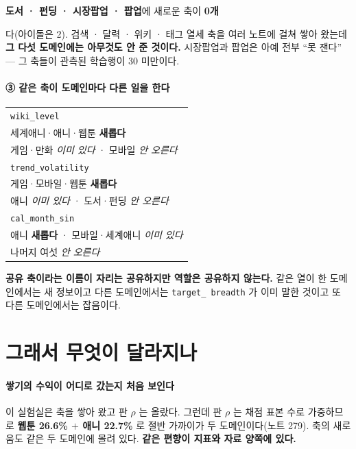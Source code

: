 \documentclass[10pt]{article}
\begin{document}
\begin{center}\small
\textbf{도서 · 펀딩 · 시장팝업 · 팝업}에 새로운 축이 \textbf{0개}
\end{center}

다(아이돌은 2). 검색 · 달력 · 위키 · 태그 열세 축을 여러 노트에 걸쳐 쌓아
왔는데 \textbf{그 다섯 도메인에는 아무것도 안 준 것이다.} 시장팝업과 팝업은
아예 전부 ``못 잰다'' --- 그 축들이 관측된 학습행이 30 미만이다.

\paragraph{③ 같은 축이 도메인마다 다른 일을 한다}

\begin{center}\footnotesize
\begin{tabular}{l}
\hline
\texttt{wiki\_level} \\
\quad 세계애니·애니·웹툰 \textbf{새롭다} \\
\quad 게임·만화 \emph{이미 있다} · 모바일 \emph{안 오른다} \\
\hline
\texttt{trend\_volatility} \\
\quad 게임·모바일·웹툰 \textbf{새롭다} \\
\quad 애니 \emph{이미 있다} · 도서·펀딩 \emph{안 오른다} \\
\hline
\texttt{cal\_month\_sin} \\
\quad 애니 \textbf{새롭다} · 모바일·세계애니 \emph{이미 있다} \\
\quad 나머지 여섯 \emph{안 오른다} \\
\hline
\end{tabular}
\end{center}

\textbf{공유 축이라는 이름이 자리는 공유하지만 역할은 공유하지 않는다.}
같은 열이 한 도메인에서는 새 정보이고 다른 도메인에서는 \texttt{target\_
breadth} 가 이미 말한 것이고 또 다른 도메인에서는 잡음이다.

\section{그래서 무엇이 달라지나}

\paragraph{쌓기의 수익이 어디로 갔는지 처음 보인다} 이 실험실은 축을 쌓아
왔고 판 $\rho$ 는 올랐다. 그런데 판 $\rho$ 는 채점 표본 수로 가중하므로
\textbf{웹툰 26.6\% $+$ 애니 22.7\%} 로 절반 가까이가 두 도메인이다(노트 279).
축의 새로움도 같은 두 도메인에 몰려 있다. \textbf{같은 편향이 지표와 자료
양쪽에 있다.}
\end{document}
